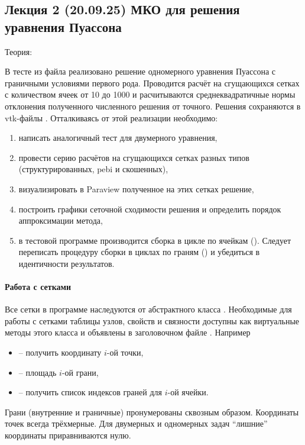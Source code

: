 \subsection{Лекция 2 (20.09.25) МКО для решения уравнения Пуассона}
\label{sec:hw_fvm2d}
Теория: 

В тесте  из файла 
реализовано решение одномерного уравнения Пуассона с граничными условиями первого рода.
Проводится расчёт на сгущающихся сетках с количеством ячеек от 10 до 1000
и расчитываются среднеквадратичные нормы отклонения полученного численного решения от точного.
Решения сохраняются в vtk-файлы .
Отталкиваясь от этой реализации необходимо:
\begin{enumerate}
\item написать аналогичный тест для двумерного уравнения,
\item провести серию расчётов на сгущающихся сетках разных типов (структурированных, pebi и скошенных),
\item визуализировать в Paraview полученное на этих сетках решение,
\item построить графики сеточной сходимости решения и определить порядок аппроксимации метода,
\item в тестовой программе производится сборка в цикле по ячейкам ().
      Следует переписать процедуру сборки в циклах по граням () и убедиться
      в идентичности результатов.
\end{enumerate}

\paragraph{Работа с сетками}
Все сетки в программе наследуются от абстрактного класса .
Необходимые для работы с сетками таблицы узлов, свойств и связности доступны
как виртуальные методы этого класса и объявлены в заголовочном файле . Например
\begin{itemize}
\item {} -- получить координату $i$-ой точки,
\item {} -- площадь $i$-ой грани,
\item {} -- получить список индексов граней для $i$-ой ячейки.
\end{itemize}
Грани (внутренние и граничные) пронумерованы сквозным образом.
Координаты точек всегда трёхмерные. Для двумерных и одномерных задач ``лишние'' координаты приравниваются нулю.

